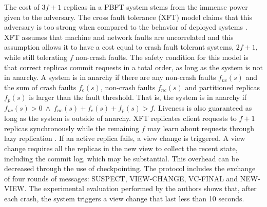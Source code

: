 \documentclass[runningheads,a4paper]{llncs}
\begin{document}
The cost of $3f+1$ replicas in a PBFT system stems from the immense power given to the adversary. The cross fault tolerance (XFT) model claims that this adversary is too strong when compared to the behavior of deployed systems \cite{Liu2015}. XFT assumes that machine and network faults are uncorrelated and this assumption allows it to have a cost equal to crash fault tolerant systems, $2f+1$, while still tolerating $f$ non-crash faults. The safety condition for this model is that correct replicas commit requests in a total order, as long as the system is not in anarchy. A system is in anarchy if there are any non-crash faults $f_{nc}(s)$ and the sum of crash faults $f_c(s)$, non-crash faults $f_{nc}(s)$ and partitioned replicas $f_p(s)$ is larger than the fault threshold. That is, the system is in anarchy if $f_{nc}(s) > 0\ \land\ f_{nc}(s)+ f_c(s)+f_p(s) > f$. Liveness is also guaranteed as long as the system is outside of anarchy. XFT replicates client requests to $f+1$ replicas synchronously while the remaining $f$ may learn about requests through lazy replication \cite{Ladin1992}. If an active replica fails, a view change is triggered. A view change requires all the replicas in the new view to collect the recent state, including the commit log, which may be substantial. This overhead can be decreased through the use of checkpointing. The protocol includes the exchange of four rounds of messages: SUSPECT, VIEW-CHANGE, VC-FINAL and NEW-VIEW. The experimental evaluation performed by the authors shows that, after each crash, the system triggers a view change that last less than 10 seconds. \par
\end{document}
